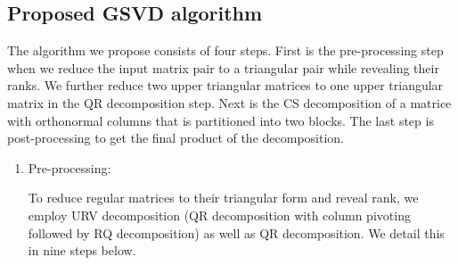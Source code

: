  \subsection{Proposed GSVD algorithm} \label{alg}
    The algorithm we propose consists of four steps. First is the pre-processing step when we reduce the input matrix pair to a triangular pair while revealing their ranks. \cite{bai1993new} We further reduce two upper triangular matrices to one upper triangular matrix in the QR decomposition step. Next is the CS decomposition of a matrice with orthonormal columns that is partitioned into two blocks. \cite{van1976generalizing} The last step is post-processing to get the final product of the decomposition. 
    
    \begin{enumerate}
        \item Pre-processing: 
        
            To reduce regular matrices to their triangular form and reveal rank, we employ URV decomposition (QR decomposition with column pivoting followed by RQ decomposition) \cite{golub2013matrix} as well as QR decomposition. We detail this in nine steps below.
            

\end{enumerate}
